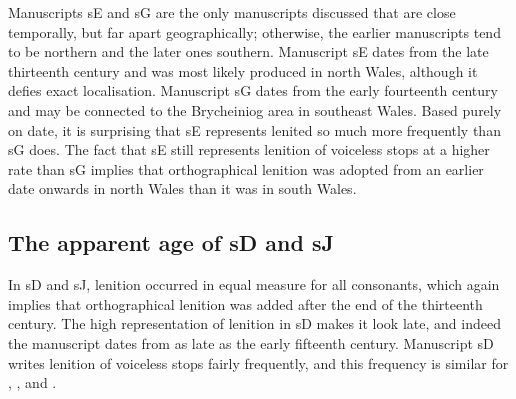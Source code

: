 Manuscripts \gls{sE} and \gls{sG} are the only manuscripts discussed that are close temporally, but far apart geographically; otherwise, the earlier manuscripts tend to be northern and the later ones southern.
Manuscript \gls{sE} dates from the late thirteenth century and was most likely produced in north Wales, although it defies exact localisation. Manuscript \gls{sG} dates from the early fourteenth century and may be connected to the Brycheiniog area in southeast Wales. Based purely on date, it is surprising that \gls{sE} represents lenited  so much more frequently than \gls{sG} does. The fact that \gls{sE} still represents lenition of voiceless stops at a higher rate than \gls{sG} implies that orthographical lenition was adopted from an earlier date onwards in north Wales than it was in south Wales.

\subsection{The apparent age of \gls{sD} and \gls{sJ}}
\label{sec:apparent-age-glssd}

In \gls{sD} and \gls{sJ}, lenition occurred in equal measure for all consonants, which again implies that orthographical lenition was added after the end of the thirteenth century. 
The high representation of lenition in \gls{sD} makes it look late, and indeed the manuscript dates from as late as the early fifteenth century. Manuscript \gls{sD} writes lenition of voiceless stops fairly frequently, and this frequency is similar for , , and .

